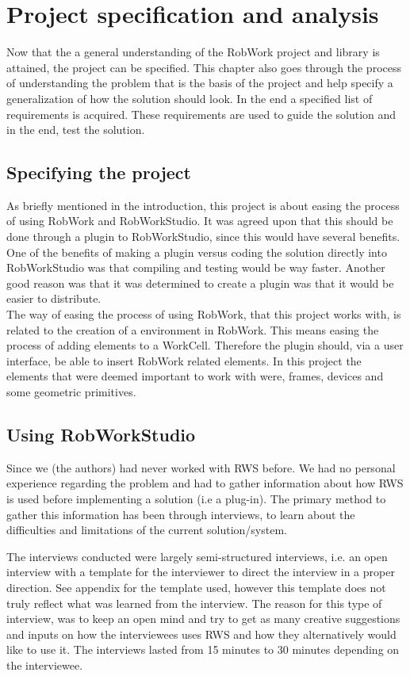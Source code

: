 \section{Project specification and analysis}
Now that the a general understanding of the RobWork project and library is attained, the project can be specified. This chapter also goes through the process of understanding the problem that is the basis of the project and help specify a generalization of how the solution should look. In the end a specified list of requirements is acquired. These requirements are used to guide the solution and in the end, test the solution.

\subsection{Specifying the project}
As briefly mentioned in the introduction, this project is about easing the process of using RobWork and RobWorkStudio. It was agreed upon that this should be done through a plugin to RobWorkStudio, since this would have several benefits. One of the benefits of making a plugin versus coding the solution directly into RobWorkStudio was that compiling and testing would be way faster. Another good reason was that it was determined to create a plugin was that it would be easier to distribute.\\

The way of easing the process of using RobWork, that this project works with, is related to the creation of a environment in RobWork. This means easing the process of adding elements to a WorkCell. Therefore the plugin should, via a user interface, be able to insert RobWork related elements. In this project the elements that were deemed important to work with were, frames, devices and some geometric primitives.

\subsection{Using RobWorkStudio}
Since we (the authors) had never worked with RWS before. We had no personal experience regarding the problem and had to gather information about how RWS is used before implementing a solution (i.e a plug-in). The primary method to gather this information has been through interviews, to learn about the difficulties and limitations of the current solution/system.

The interviews conducted were largely semi-structured interviews, i.e. an open interview with a template for the interviewer to direct the interview in a proper direction. See appendix for the template used, however this template does not truly reflect what was learned from the interview. The reason for this type of interview, was to keep an open mind and try to get as many creative suggestions and inputs on how the interviewees uses RWS and how they alternatively would like to use it. The interviews lasted from 15 minutes to 30 minutes depending on the interviewee.

